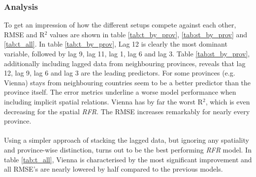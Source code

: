 \documentclass[a4paper,reqno,]{article}
\begin{document}
\subsubsection{Analysis}
\label{sssec:anal}
To get an impression of how the different setups compete against each other, RMSE and R$^{2}$ values are shown in table \ref{tab:t_by_prov}, \ref{tab:st_by_prov} and \ref{tab:t_all}. 
In table \ref{tab:t_by_prov}, Lag 12 is clearly the most dominant variable, followed by  lag 9, lag 11, lag 1, lag 6 and lag 3. %
Table \ref{tab:st_by_prov}, additionally including lagged data from neighbouring provinces, reveals that lag 12, lag 9, lag 6 and lag 3 are the leading predictors. For some provinces (e.g. Vienna) stays from neighbouring countries seem to be a better predictor than the province itself. The error metrics underline a worse model performance when including implicit spatial relations. Vienna has by far the worst R$^{2}$, which is even decreasing for the spatial \textit{RFR}. The RMSE increases remarkably for nearly every province. 
\\
\\
Using a simpler approach of stacking the lagged data, but ignoring any spatiality and province-wise distinction, turns out to be the best performing \textit{RFR} model. In table \ref{tab:t_all}, Vienna is characterised by the most significant improvement and all RMSE's are nearly lowered by half compared to the previous models.  
\newpage
\end{document}
